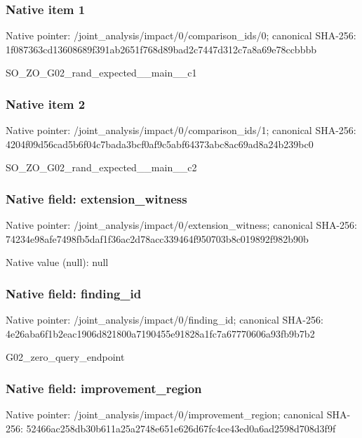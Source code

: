 \documentclass[10pt,a4paper]{article}
\begin{document}
\subsubsection{Native item 1}
Native pointer: /joint\_\allowbreak{}analysis/impact/0/comparison\_\allowbreak{}ids/0; canonical SHA-256: 1f087363cd13608689f391ab2651f768d89bad2c7447d312c7a8a69e78ccbbbb

\begingroup\raggedright\sloppy SO\_\allowbreak{}ZO\_\allowbreak{}G02\_\allowbreak{}rand\_\allowbreak{}expected\_\allowbreak{}\_\allowbreak{}main\_\allowbreak{}\_\allowbreak{}c1\par\endgroup

\subsubsection{Native item 2}
Native pointer: /joint\_\allowbreak{}analysis/impact/0/comparison\_\allowbreak{}ids/1; canonical SHA-256: 4204f09d56cad5b6f04c7bada3bcf0af9c5abf64373abc8ac69ad8a24b239bc0

\begingroup\raggedright\sloppy SO\_\allowbreak{}ZO\_\allowbreak{}G02\_\allowbreak{}rand\_\allowbreak{}expected\_\allowbreak{}\_\allowbreak{}main\_\allowbreak{}\_\allowbreak{}c2\par\endgroup

\subsubsection{Native field: extension\_\allowbreak{}witness}
Native pointer: /joint\_\allowbreak{}analysis/impact/0/extension\_\allowbreak{}witness; canonical SHA-256: 74234e98afe7498fb5daf1f36ac2d78acc339464f950703b8c019892f982b90b

Native value (null): null

\subsubsection{Native field: finding\_\allowbreak{}id}
Native pointer: /joint\_\allowbreak{}analysis/impact/0/finding\_\allowbreak{}id; canonical SHA-256: 4e26aba6f1b2eac1906d821800a7190455e91828a1fc7a67770606a93fb9b7b2

\begingroup\raggedright\sloppy G02\_\allowbreak{}zero\_\allowbreak{}query\_\allowbreak{}endpoint\par\endgroup

\subsubsection{Native field: improvement\_\allowbreak{}region}
Native pointer: /joint\_\allowbreak{}analysis/impact/0/improvement\_\allowbreak{}region; canonical SHA-256: 52466ac258db30b611a25a2748e651e626d67fc4ce43ed0a6ad2598d708d3f9f
\end{document}

